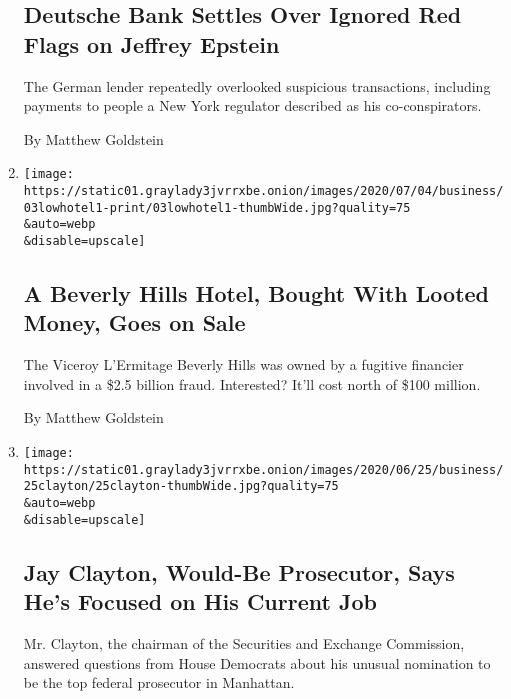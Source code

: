 \begin{enumerate}
  \hypertarget{deutsche-bank-settles-over-ignored-red-flags-on-jeffrey-epstein}{%
  \subsection{Deutsche Bank Settles Over Ignored Red Flags on Jeffrey
  Epstein}\label{deutsche-bank-settles-over-ignored-red-flags-on-jeffrey-epstein}}

  The German lender repeatedly overlooked suspicious transactions,
  including payments to people a New York regulator described as his
  co-conspirators.

  By Matthew Goldstein
\item
  \href{/2020/07/03/business/viceroy-beverly-hills-1MDB-fraud.html}{}

  \texttt{[image: https://static01.graylady3jvrrxbe.onion/images/2020/07/04/business/03lowhotel1-print/03lowhotel1-thumbWide.jpg?quality=75\\\&auto=webp\\\&disable=upscale]}

  \hypertarget{a-beverly-hills-hotel-bought-with-looted-money-goes-on-sale}{%
  \subsection{A Beverly Hills Hotel, Bought With Looted Money, Goes on
  Sale}\label{a-beverly-hills-hotel-bought-with-looted-money-goes-on-sale}}

  The Viceroy L'Ermitage Beverly Hills was owned by a fugitive financier
  involved in a \$2.5 billion fraud. Interested? It'll cost north of
  \$100 million.

  By Matthew Goldstein
\item
  \href{/2020/06/25/business/jay-clayton-sec-sdny.html}{}

  \texttt{[image: https://static01.graylady3jvrrxbe.onion/images/2020/06/25/business/25clayton/25clayton-thumbWide.jpg?quality=75\\\&auto=webp\\\&disable=upscale]}

  \hypertarget{jay-clayton-would-be-prosecutor-says-hes-focused-on-his-current-job}{%
  \subsection{Jay Clayton, Would-Be Prosecutor, Says He's Focused on His
  Current
  Job}\label{jay-clayton-would-be-prosecutor-says-hes-focused-on-his-current-job}}

  Mr. Clayton, the chairman of the Securities and Exchange Commission,
  answered questions from House Democrats about his unusual nomination
  to be the top federal prosecutor in Manhattan.


\end{enumerate}
